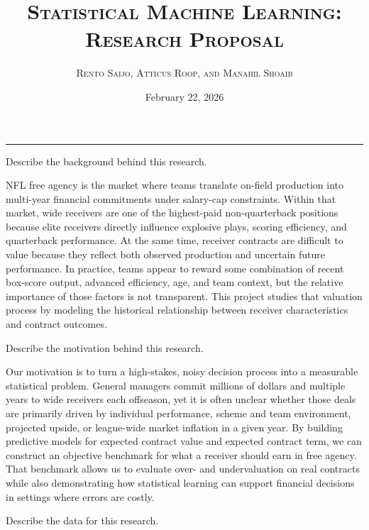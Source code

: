 \documentclass[10pt]{extarticle}
\title{\centering\Large\textsc{\textbf{Statistical Machine Learning: Research Proposal}}}
\author{\large \textsc{Rento Saijo, Atticus Roop, and Manahil Shoaib}}
\date{February 22, 2026}
\begin{document}
\maketitle
\thispagestyle{fancy}
\vspace{-1em}\noindent\rule{\linewidth}{0.6pt}\vspace{0.5em}

\begin{problem}
[I. Background]
Describe the background behind this research.
\end{problem}

\noindent NFL free agency is the market where teams translate on-field production into multi-year financial commitments under salary-cap constraints. Within that market, wide receivers are one of the highest-paid non-quarterback positions because elite receivers directly influence explosive plays, scoring efficiency, and quarterback performance. At the same time, receiver contracts are difficult to value because they reflect both observed production and uncertain future performance. In practice, teams appear to reward some combination of recent box-score output, advanced efficiency, age, and team context, but the relative importance of those factors is not transparent. This project studies that valuation process by modeling the historical relationship between receiver characteristics and contract outcomes.

\begin{problem}
[II. Motivation]
Describe the motivation behind this research.
\end{problem}

\noindent Our motivation is to turn a high-stakes, noisy decision process into a measurable statistical problem. General managers commit millions of dollars and multiple years to wide receivers each offseason, yet it is often unclear whether those deals are primarily driven by individual performance, scheme and team environment, projected upside, or league-wide market inflation in a given year. By building predictive models for expected contract value and expected contract term, we can construct an objective benchmark for what a receiver should earn in free agency. That benchmark allows us to evaluate over- and undervaluation on real contracts while also demonstrating how statistical learning can support financial decisions in settings where errors are costly.

\begin{problem}
Describe the data for this research.
\end{problem}
\end{document}
